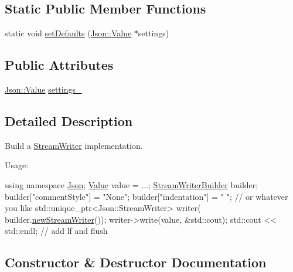 \subsection*{Static Public Member Functions}
\begin{DoxyCompactItemize}
\item 
static void \hyperlink{classJson_1_1StreamWriterBuilder_a53bf106b141e28637b01ad0ecd2acbf6_a53bf106b141e28637b01ad0ecd2acbf6}{set\+Defaults} (\hyperlink{classJson_1_1Value}{Json\+::\+Value} $\ast$settings)
\end{DoxyCompactItemize}
\subsection*{Public Attributes}
\begin{DoxyCompactItemize}
\item 
\hyperlink{classJson_1_1Value}{Json\+::\+Value} \hyperlink{classJson_1_1StreamWriterBuilder_a79bdf2e639a52f4e758c0b95bd1d3423_a79bdf2e639a52f4e758c0b95bd1d3423}{settings\+\_\+}
\end{DoxyCompactItemize}


\subsection{Detailed Description}
Build a \hyperlink{classJson_1_1StreamWriter}{Stream\+Writer} implementation. 

Usage\+: 
\begin{DoxyCode}
\textcolor{keyword}{using namespace }\hyperlink{namespaceJson}{Json};
\hyperlink{classJson_1_1Value}{Value} value = ...;
\hyperlink{classJson_1_1StreamWriterBuilder}{StreamWriterBuilder} builder;
builder[\textcolor{stringliteral}{"commentStyle"}] = \textcolor{stringliteral}{"None"};
builder[\textcolor{stringliteral}{"indentation"}] = \textcolor{stringliteral}{"   "};  \textcolor{comment}{// or whatever you like}
std::unique\_ptr<Json::StreamWriter> writer(
    builder.\hyperlink{classJson_1_1StreamWriterBuilder_ab9ee278609f88ae04a7c1a84e1f559e6_ab9ee278609f88ae04a7c1a84e1f559e6}{newStreamWriter}());
writer->write(value, &std::cout);
std::cout << std::endl;  \textcolor{comment}{// add lf and flush}
\end{DoxyCode}
 

\subsection{Constructor \& Destructor Documentation}
\mbox{\label{classJson_1_1StreamWriterBuilder_ab95b76179c152673ad14abc639a46ee4_ab95b76179c152673ad14abc639a46ee4}} 

